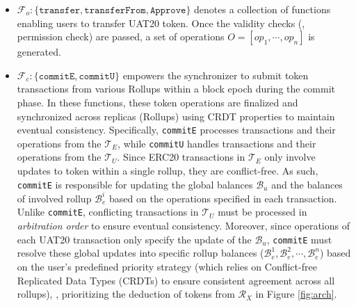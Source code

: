 \begin{defn}
\begin{itemize}[leftmargin=*]
\item $\mathcal{F}_o: \{\mathtt{transfer}, \mathtt{transferFrom}, \mathtt{Approve}\}$ denotes a collection of functions enabling users to transfer UAT20 token. Once the validity checks (\eg, permission check) are passed, a set of operations $O= [op_1, \cdots, op_n]$ is generated.
\item $\mathcal{F}_c: \{\mathtt{commitE}, \mathtt{commitU}\}$ empowers the synchronizer to submit token transactions from various Rollups within a block epoch during the commit phase.  In these functions, these token operations are finalized and synchronized across replicas (Rollups) using CRDT properties to maintain eventual consistency.
Specifically, \texttt{commitE} processes transactions and their operations from the $\mathcal{T}_E$, while \texttt{commitU} handles transactions and their operations from the $\mathcal{T}_U$. 
Since ERC20 transactions in $\mathcal{T}_E$ only involve updates to token within a single rollup, they are conflict-free. As such, \texttt{commitE} is 
responsible for updating the global balances $\mathcal{B}_u$ and the balances of involved rollup $\mathcal{B}^i_e$ based on the operations specified in each transaction.
Unlike \texttt{commitE}, conflicting transactions in $\mathcal{T}_U$ must be processed in \emph{arbitration order} to ensure eventual consistency.
Moreover, since operations of each UAT20 transaction only specify the update of the $\mathcal{B}_u$, \texttt{commitE} must resolve these global updates into specific rollup balances ($\mathcal{B}^1_e, \mathcal{B}^2_e, \cdots, \mathcal{B}^n_e$) based on the user's predefined priority strategy (which relies on Conflict-free Replicated Data Types (CRDTs) to ensure consistent agreement across all rollups), \eg,  prioritizing the deduction of tokens from $\mathcal{R}_X$ in Figure \ref{fig:arch}. 
\end{itemize}



\end{defn}




